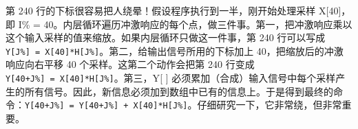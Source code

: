 \begin{Shaded}
\begin{Highlighting}[]
\PreprocessorTok{                   }
\PreprocessorTok{                   }
\OperatorTok{(}\OperatorTok{+}\OperatorTok{{-}}\PreprocessorTok{ }\OperatorTok{)}\PreprocessorTok{        }

 \OperatorTok{(}  \OperatorTok{*}\OperatorTok{,}   \OperatorTok{*}\OperatorTok{,}  \OperatorTok{*}\OperatorTok{)}
\OperatorTok{\{}
     \OperatorTok{(}\OperatorTok{=} \OperatorTok{;}\OperatorTok{\textless{}}\OperatorTok{;}\OperatorTok{++)}        
\OperatorTok{[}\OperatorTok{]} \OperatorTok{=} \OperatorTok{;}

     \OperatorTok{(}\OperatorTok{=} \OperatorTok{;}\OperatorTok{\textless{}}\OperatorTok{;}\OperatorTok{++)}        
         \OperatorTok{(}\OperatorTok{=} \OperatorTok{;}\OperatorTok{\textless{}}\OperatorTok{;}\OperatorTok{++)}    
\OperatorTok{[}\OperatorTok{+}\OperatorTok{]} \OperatorTok{+=}\OperatorTok{[}\OperatorTok{]} \OperatorTok{*}\OperatorTok{[}\OperatorTok{];}    
\OperatorTok{\}}
\end{Highlighting}
\end{Shaded}

第 240 行的下标很容易把人绕晕！假设程序执行到一半，刚开始处理采样
X{[}40{]}，即 I\% =
40。内层循环遍历冲激响应的每个点，做三件事。第一，把冲激响应乘以这个输入采样的值来缩放。如果内层循环只做这一件事，第
240 行可以写成
\texttt{Y{[}J\%{]}\ =\ X{[}40{]}*H{[}J\%{]}}。第二，给输出信号所用的下标加上
40，把缩放后的冲激响应向右平移 40 个采样。这第二个动作会把第 240 行变成
\texttt{Y{[}40+J\%{]}\ =\ X{[}40{]}*H{[}J\%{]}}。第三，Y{[} {]}
必须累加（合成）输入信号中每个采样产生的所有信号。因此，新信息必须加到数组中已有的信息上。于是得到最终的命令：\texttt{Y{[}40+J\%{]}\ =\ Y{[}40+J\%{]}\ +\ X{[}40{]}*H{[}J\%{]}}。仔细研究一下，它非常绕，但非常重要。

